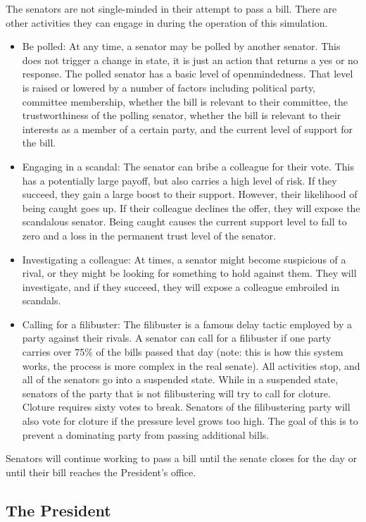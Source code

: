 \documentclass{sig-alternate}
\newcounter{over}
\newenvironment{smallitem}
 {\setlength{\topsep}{0pt}
  \setlength{\partopsep}{0pt}
  \setlength{\parskip}{0pt}
  \begin{itemize}
   \setlength{\leftmargin}{.2in}
  \setlength{\parsep}{0pt}
  \setlength{\parskip}{0pt}
  \setlength{\itemsep}{0pt}}
 {\end{itemize}}
\newcommand{\bi}{\begin{smallitem}}
\newcommand{\ei}{\end{smallitem}}
\begin{document}
The senators are not single-minded in their attempt to pass a bill. There are other activities they can engage in during the operation of this simulation. 
\bi
\item Be polled: At any time, a senator may be polled by another senator. This does not trigger a change in state, it is just an action
that returns a yes or no response. The polled senator has a basic level
of openmindedness. That level is raised or lowered by a number of 
factors including political party, committee membership, whether the 
bill is relevant to their committee, the trustworthiness of the
polling senator, whether the bill is relevant to their interests
as a member of a certain party, and the current level of support for
the bill.
\item Engaging in a scandal: The senator can bribe a colleague for their vote. This has a potentially large payoff, but also carries a high level of risk. If they succeed, they gain a large boost to their support. However, their likelihood of being caught goes up. If their colleague declines the offer, they will expose the scandalous senator. Being caught causes the current support level to fall to zero and a loss in the permanent trust level of the senator. 
\item Investigating a colleague: At times, a senator might become suspicious of a rival, or they might be looking for something to hold against them. They will investigate, and if they succeed, they will expose a colleague embroiled in scandals. 
\item Calling for a filibuster: The filibuster is a famous delay 
tactic employed by a party against their rivals. A senator can call 
for a filibuster if one party carries over 75\% of the bills passed that day (note: this is how this system works, the process is more complex in the real senate). All activities stop, and all of the senators go into a suspended state. While in a suspended state, senators of the party that is not filibustering will try to call for cloture. Cloture requires sixty votes to break. Senators of the filibustering party will also vote for cloture if the pressure level grows too high. The goal of this is to prevent a dominating party from passing additional bills. 
\ei

Senators will continue working to pass a bill until the senate closes for the day or until their bill reaches the President's office. 

\subsection{The President}
\end{document}

